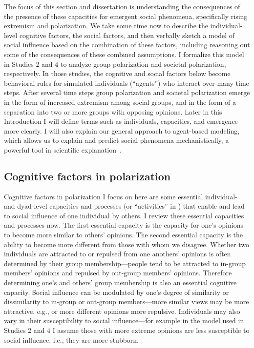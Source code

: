 \documentclass[12pt,letterpaper]{article}
\begin{document}
The focus of this 
section and dissertation is understanding the consequences of the presence of
these capacities for emergent social phenomena, specifically rising extremism
and polarization. We take some time now to describe the individual-level
cognitive factors, the social factors, and then verbally sketch a model
of social influence based on the combination of these factors, including
reasoning out some of the consequences of these combined assumptions. I formalize
this model in Studies 2 and 4 to analyze group polarization and societal 
polarization, respectively. In those studies, the cognitive and social factors
below become behavioral rules for simulated individuals (``agents'') who
interact over many time steps. After several time steps group polarization
and societal polarization emerge in the form of increased extremism among
social groups, and in the form of a separation into two or more 
groups with opposing opinions.  Later in this Introduction I will define
terms such as individuals, capacities, and emergence more clearly. I will also
explain our general approach to agent-based modeling, which allows us to
explain and predict social phenomena mechanistically, a powerful tool in
scientific explanation~\cite{Machamer2000,Craver2006,Turner2020}.


\subsection{Cognitive factors in polarization}

Cognitive factors in polarization I focus on here are some essential
individual- and dyad-level capacities and processes (or ``activities'' in
) that
enable and lead to social influence of one individual by others. I review
these essential capacities and processes now. The first essential capacity
is the capacity for one's opinions to become more similar to others' opinions.
The second essential capacity is the ability to become more different from those
with whom we disagree. Whether two individuals are attracted to or repulsed
from one anothers' opinions is often determined by their group membership---people
tend to be attracted to in-group members' opinions and repulsed by out-group
members' opinions. Therefore determining one's and others' group membership is also an essential
cognitive capacity. Social influence can be modulated by one's degree of
similarity or dissimilarity to in-group or out-group members---more similar
views may be more attractive, e.g., or more different opinions more repulsive.
Individuals may also vary in their susceptibility to social influence---for
example in the model used in Studies 2 and 4 I assume those with more
extreme opinions are less susceptible to social influence, i.e., 
they are more stubborn.
\end{document}
